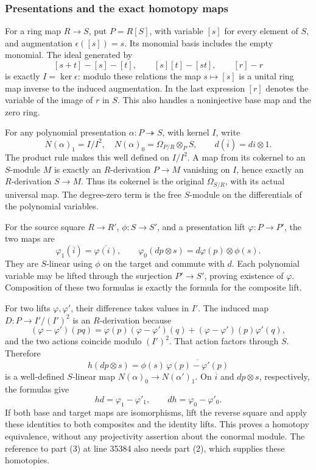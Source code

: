 \subsubsection{Presentations and the exact homotopy maps}\label{algebra-proof-044-presentations-and-the-exact-homotopy-maps}

For a ring map \(R\to S\), put \(P=R[S]\), with variable \([s]\) for every element of \(S\), and augmentation \(\epsilon([s])=s\). Its monomial basis includes the empty monomial. The ideal generated by \[
[s+t]-[s]-[t],\qquad [s][t]-[st],\qquad [r]-r
\] is exactly \(I=\ker\epsilon\): modulo these relations the map \(s\mapsto[s]\) is a unital ring map inverse to the induced augmentation. In the last expression \([r]\) denotes the variable of the image of \(r\) in \(S\). This also handles a noninjective base map and the zero ring.

For any polynomial presentation \(\alpha:P\twoheadrightarrow S\), with kernel \(I\), write \[
N(\alpha)_1=I/I^2,\quad N(\alpha)_0=\Omega_{P/R}\otimes_P S,
\qquad d(\overline i)=di\otimes1.
\] The product rule makes this well defined on \(I/I^2\). A map from its cokernel to an \(S\)-module \(M\) is exactly an \(R\)-derivation \(P\to M\) vanishing on \(I\), hence exactly an \(R\)-derivation \(S\to M\). Thus its cokernel is the original \(\Omega_{S/R}\), with its actual universal map. The degree-zero term is the free \(S\)-module on the differentials of the polynomial variables.

For the source square \(R\to R'\), \(\phi:S\to S'\), and a presentation lift \(\varphi:P\to P'\), the two maps are \[
\varphi_1(\overline i)=\overline{\varphi(i)},\qquad
\varphi_0(dp\otimes s)=d\varphi(p)\otimes\phi(s).
\] They are \(S\)-linear using \(\phi\) on the target and commute with \(d\). Each polynomial variable may be lifted through the surjection \(P'\to S'\), proving existence of \(\varphi\). Composition of these two formulas is exactly the formula for the composite lift.

For two lifts \(\varphi,\varphi'\), their difference takes values in \(I'\). The induced map \(D:P\to I'/(I')^2\) is an \(R\)-derivation because \[
(\varphi-\varphi')(pq)=\varphi(p)(\varphi-\varphi')(q)
+(\varphi-\varphi')(p)\varphi'(q),
\] and the two actions coincide modulo \((I')^2\). That action factors through \(S\). Therefore \[
h(dp\otimes s)=\phi(s)\,\overline{\varphi(p)-\varphi'(p)}
\] is a well-defined \(S\)-linear map \(N(\alpha)_0\to N(\alpha')_1\). On \(\overline i\) and \(dp\otimes s\), respectively, the formulas give \[
hd=\varphi_1-\varphi'_1,\qquad dh=\varphi_0-\varphi'_0.
\] If both base and target maps are isomorphisms, lift the reverse square and apply these identities to both composites and the identity lifts. This proves a homotopy equivalence, without any projectivity assertion about the conormal module. The reference to part (3) at line 35384 also needs part (2), which supplies these homotopies.

